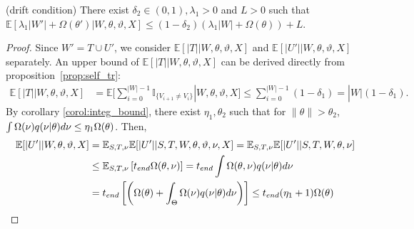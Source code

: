 \begin{lemma}(drift condition) There exist $\delta_2 \in (0, 1), \lambda_1 > 0$ and $L > 0$
  such that \\
  $\mathbb{E}\left[\lambda_1|W'| + \Omega(\theta')  | W, \theta, \vartheta, X\right]
  \leq (1 - \delta_2)\left(\lambda_1|W| + \Omega(\theta)   \right) + L$.
\label{lem:drift}
\end{lemma}
\begin{proof}
Since $W'=T\cup U'$, we consider $\mathbb{E}[|T| |W,\theta,\vartheta,X]$
and $\mathbb{E}[|U'| | W, \theta, \vartheta, X]$ separately.
An upper bound of $\mathbb{E}[|T| | W,\theta,\vartheta, X]$ can be derived
directly from proposition~\ref{prop:self_tr}:
\begin{align*}
\mathbb{E}[|T| |W,\theta,\vartheta,X] &= \mathbb{E}[\sum_{i = 0}^{|W|-1}
  \mathbb{I}_{\{ V_{i + 1} \neq V_i \}}| W, \theta, \vartheta, X]
\leq \sum_{i = 0}^{|W| - 1} (1 - \delta_1) = |W|(1 - \delta_1).
\end{align*}
By corollary \ref{corol:integ_bound}, there exist $\eta_1 , \theta_2$ 
such that for 
$ \| \theta \| > \theta_2$, 
 $ \int \Omega(\nu) q(\nu | \theta)d\nu \leq \eta_1 \Omega(\theta) 
 $. Then,
\begin{align*}
\mathbb{E}[|U'| |W, \theta, \vartheta, X] &= 
\mathbb{E}_{S,T, \ptheta}\mathbb{E}[|U'| | S, T, W, \theta, \vartheta, \ptheta, X] = \mathbb{E}_{S,T, \ptheta}\mathbb{E}[|U'| | S, T, W, \theta, \ptheta] \\
& \leq \mathbb{E}_{S,T, \ptheta} \left[t_{end}\Omega(\theta, \ptheta)\right] = t_{end}\int \Omega(\theta, \ptheta) q(\ptheta | \theta) d\ptheta\\
& = t_{end} \left[ \left(  \Omega(\theta) +
\int_\Theta \Omega(\ptheta) q(\ptheta | \theta)d\ptheta \right) \right] 
 \leq t_{end} (\eta_1 + 1) \Omega(\theta) %
\end{align*}

\end{proof}
